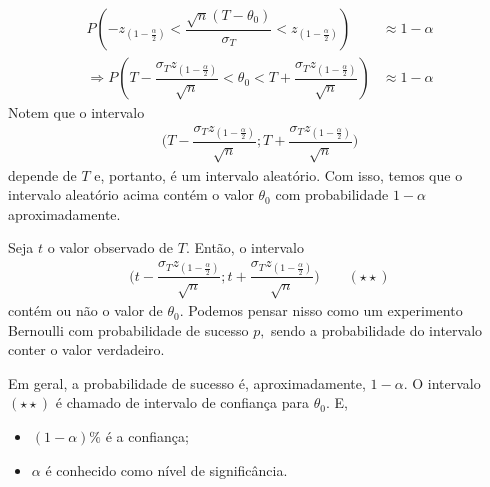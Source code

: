 \documentclass[12pt]{beamer}
\begin{document}
\begin{frame}{}
\begin{block}{}
\justifying
\begin{align*}
P(-z_{(1-\frac{\alpha}{2})}<\dfrac{\sqrt{n}(T-\theta_{0})}{\sigma_{T}}<z_{(1-\frac{\alpha}{2})})&\approx 1-\alpha\\
\Rightarrow P(T-\dfrac{\sigma_{T}z_{(1-\frac{\alpha}{2})}}{\sqrt{n}}<\theta_{0}<T+\dfrac{\sigma_{T}z_{(1-\frac{\alpha}{2})}}{\sqrt{n}})&\approx 1-\alpha
\end{align*}
Notem que o intervalo
\begin{align*}
    \Big(T-\dfrac{\sigma_{T}z_{(1-\frac{\alpha}{2})}}{\sqrt{n}};T+\dfrac{\sigma_{T}z_{(1-\frac{\alpha}{2})}}{\sqrt{n}}\Big)
\end{align*}
depende de $T$ e, portanto, é um intervalo aleatório. Com isso, temos que o intervalo aleatório acima contém o valor $\theta_{0}$ com probabilidade $1-\alpha$ aproximadamente.
\end{block}
\end{frame}

\begin{frame}{}
\begin{block}{}
\justifying
Seja $t$ o valor observado de $T.$ Então, o intervalo
\begin{align*}
    \Big(t-\dfrac{\sigma_{T}z_{(1-\frac{\alpha}{2})}}{\sqrt{n}};t+\dfrac{\sigma_{T}z_{(1-\frac{\alpha}{2})}}{\sqrt{n}}\Big)\qquad (\star\star)
\end{align*}
contém ou não o valor de $\theta_{0}.$ Podemos pensar nisso como um experimento Bernoulli com probabilidade de sucesso $p,$ sendo a probabilidade do intervalo conter o valor verdadeiro. 
\end{block}
\pause
\begin{block}{}
\justifying
Em geral, a probabilidade de sucesso é, aproximadamente, $1-\alpha.$ O intervalo $(\star\star)$ é chamado de intervalo de confiança para $\theta_{0}.$ E,
\begin{itemize}
    \item $(1-\alpha)\%$ é a confiança;
    \item $\alpha$ é conhecido como nível de significância.
\end{itemize}
\end{block}
\end{frame}
\end{document}
